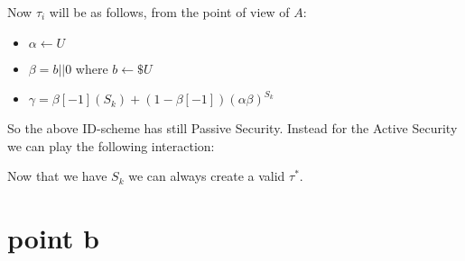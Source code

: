 \newpage

Now $\tau_i$ will be as follows, from the point of view of $A$:

\begin{itemize}
    \item $\alpha\leftarrow U$
    \item $\beta=b||0$ where $b\leftarrow\$ U$
    \item $\gamma=\beta[-1](S_k)+(1-\beta[-1])(\alpha \beta)^{S_k}$
\end{itemize}

So the above ID-scheme has still Passive Security. Instead for the Active Security we can play the following interaction:

\begin{figure}[h!]
    \centering
    \sdinit{}
\end{figure}

Now that we have $S_k$ we can always create a valid $\tau^*$.

\section{point b}

